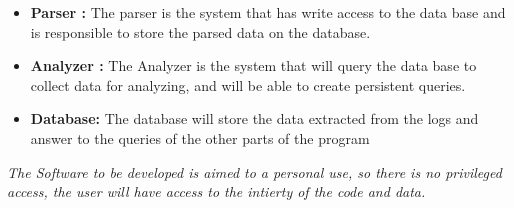 \documentclass{scrreprt}
\begin{document}
\begin{itemize}
 \item \textbf{Parser :} The parser is the system that has write access to the data
   base and is responsible to store the parsed data on the database.
 \item \textbf{Analyzer :} The Analyzer is the system that will query the data
   base to collect data for analyzing, and will be able to create persistent queries.
   \item \textbf{Database: } The database will store the data extracted from the logs and answer to the queries of the other parts of the program
\end{itemize}

\textit{The Software to be developed is aimed to a personal use, so there is no privileged access, the user will have access to the intierty of the code and data.}
\end{document}
